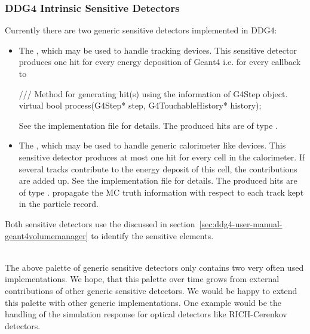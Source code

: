 \subsubsection{DDG4 Intrinsic Sensitive Detectors}
\noindent
Currently there are two generic sensitive detectors implemented in DDG4:
\begin{itemize}\itemcompact
\item The , which may be used to handle tracking devices.
  This sensitive detector produces one hit for every energy deposition of Geant4
  i.e. for every callback to 
\begin{unnumberedcode}
  /// Method for generating hit(s) using the information of G4Step object.
  virtual bool process(G4Step* step, G4TouchableHistory* history);
\end{unnumberedcode}
  See the implementation file 
  for details. The produced hits are of type 
  .

\item The , which may be used to handle 
  generic calorimeter like devices.
  This sensitive detector produces at most one hit for every cell in the calorimeter.
  If several tracks contribute to the energy deposit of this cell, the contributions
  are added up.
  See the implementation file 
  for details. The produced hits are of type 
  .
  propagate the MC truth information with respect to each track kept in the 
  particle record.
\end{itemize}

\noindent
Both sensitive detectors use the  discussed in 
section~\ref{sec:ddg4-user-manual-geant4volumemanager} to identify the sensitive elements.

\noindent
{}\\
The above palette of generic sensitive detectors only contains two very
often used implementations. We hope, that this palette over time grows from
external contributions of other generic sensitive detectors. We would be happy 
to extend this palette with other generic implementations. One example would
be the handling of the simulation response for optical detectors like RICH-Cerenkov
detectors.

